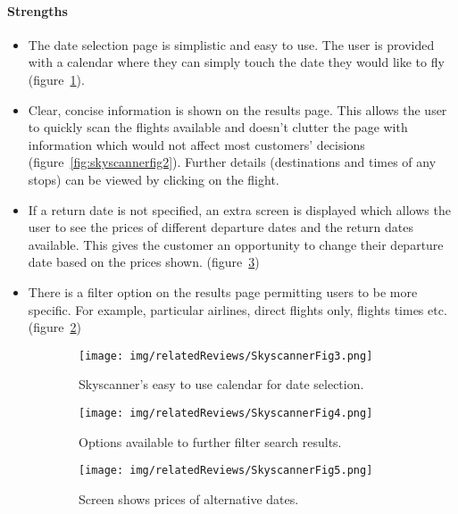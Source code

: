 \paragraph{Strengths}
\begin{itemize}
	\item The date selection page is simplistic and easy to use. The user is
		provided with a calendar where they can simply touch the date they
		would like to fly (figure~\ref{fig:skyscannerfig3}).
	\item Clear, concise information is shown on the results page. This allows
		the user to quickly scan the flights available and doesn't clutter the
		page with information which would not affect most customers' decisions
		(figure~\ref{fig:skyscannerfig2}). Further details (destinations and times
		of any stops) can be viewed by clicking on the flight.
	\item If a return date is not specified, an extra screen is displayed which
		allows the user to see the prices of different departure dates and the
		return dates available. This gives the customer an opportunity to
		change their departure date based on the prices shown.
		(figure~\ref{fig:skyscannerfig5})
	\item There is a filter option on the results page permitting users to be
		more specific. For example, particular airlines, direct flights only,
		flights times etc. (figure~\ref{fig:skyscannerfig4})
\end{itemize}
\begin{figure}[htbp]
	\centering
	\begin{subfigure}[b]{0.28\textwidth}
		\texttt{[image: img/relatedReviews/SkyscannerFig3.png]}
		\caption{Skyscanner's easy to use calendar for date selection.
		}\label{fig:skyscannerfig3}
	\end{subfigure}
	\qquad
	\begin{subfigure}[b]{0.28\textwidth}
		\texttt{[image: img/relatedReviews/SkyscannerFig4.png]}
		\caption{Options available to further filter search results.
		}\label{fig:skyscannerfig4}
	\end{subfigure}
	\qquad
	\begin{subfigure}[b]{0.28\textwidth}
		\texttt{[image: img/relatedReviews/SkyscannerFig5.png]}
		\caption{Screen shows prices of alternative dates.
		}\label{fig:skyscannerfig5}
	\end{subfigure}
	\caption{}\label{fig:skyscanner2}
\end{figure}

